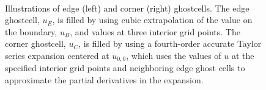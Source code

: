 \documentclass[oneeqnum,onefignum,onetabnum,onethmnum]{siamltex}
\begin{document}
\begin{figure}[tb]
\begin{center}
\ \ \ \ \ \ \ \ \ \ \ \ \ 
\caption{Illustrations of edge (left) and corner (right) ghostcells.
The edge ghostcell, $u_E$, is filled by using cubic extrapolation of 
the value on the boundary, $u_B$, and values at three interior grid points.  
The corner ghostcell, $u_C$, is filled by using a fourth-order accurate
Taylor series expansion centered at $u_{0,0}$, which uses the values of $u$ 
at the specified interior grid points and neighboring edge ghost cells to 
approximate the partial derivatives in the expansion. 
}
\label{fig:ghost_cells}
\end{center}
\end{figure}
\end{document}
